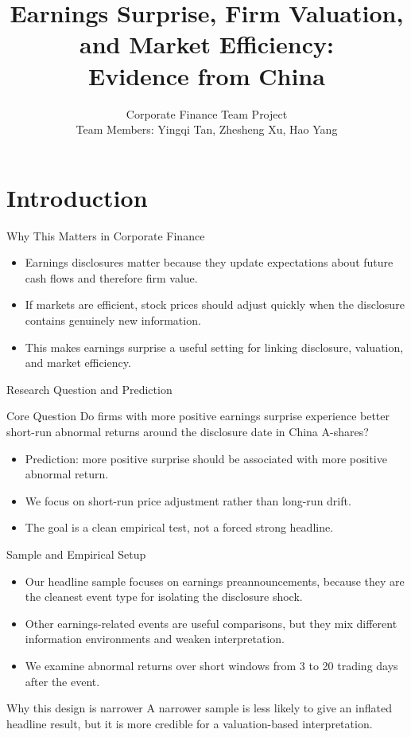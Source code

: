 \documentclass[aspectratio=169,11pt]{beamer}
\title{Earnings Surprise, Firm Valuation, and Market Efficiency:\\Evidence from China}
\author{Corporate Finance Team Project\\[0.4em]\small Team Members: Yingqi Tan, Zhesheng Xu, Hao Yang}
\institute{FIN803 Corporate Finance}
\date{}
\begin{document}
\begin{frame}[plain]
  \titlepage
\end{frame}

\section{Introduction}

\begin{frame}{Why This Matters in Corporate Finance}
\begin{itemize}
  \item Earnings disclosures matter because they update expectations about future cash flows and therefore firm value.
  \item If markets are efficient, stock prices should adjust quickly when the disclosure contains genuinely new information.
  \item This makes earnings surprise a useful setting for linking disclosure, valuation, and market efficiency.
\end{itemize}
\end{frame}

\begin{frame}{Research Question and Prediction}
\begin{block}{Core Question}
Do firms with more positive earnings surprise experience better short-run abnormal returns around the disclosure date in China A-shares?
\end{block}
\begin{itemize}
  \item Prediction: more positive surprise should be associated with more positive abnormal return.
  \item We focus on short-run price adjustment rather than long-run drift.
  \item The goal is a clean empirical test, not a forced strong headline.
\end{itemize}
\end{frame}

\begin{frame}{Sample and Empirical Setup}
\begin{itemize}
  \item Our headline sample focuses on earnings preannouncements, because they are the cleanest event type for isolating the disclosure shock.
  \item Other earnings-related events are useful comparisons, but they mix different information environments and weaken interpretation.
  \item We examine abnormal returns over short windows from 3 to 20 trading days after the event.
\end{itemize}
\begin{block}{Why this design is narrower}
A narrower sample is less likely to give an inflated headline result, but it is more credible for a valuation-based interpretation.
\end{block}
\end{frame}
\end{document}

